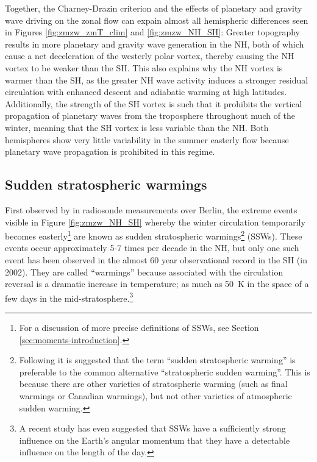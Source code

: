 \bigskip Together, the Charney-Drazin criterion and the effects of planetary and
gravity wave driving on the zonal flow can expain almost all hemispheric
differences seen in Figures \ref{fig:zmzw_zmT_clim} and \ref{fig:zmzw_NH_SH}:
Greater topography results in more planetary and gravity wave generation in the
NH, both of which cause a net deceleration of the westerly polar vortex, thereby
causing the NH vortex to be weaker than the SH. This also explains why the NH
vortex is warmer than the SH, as the greater NH wave activity induces a stronger
residual circulation with enhanced descent and adiabatic warming at high
latitudes. Additionally, the strength of the SH vortex is such that it prohibits
the vertical propagation of planetary waves from the troposphere throughout much
of the winter, meaning that the SH vortex is less variable than the NH. Both
hemispheres show very little variability in the summer easterly flow because
planetary wave propagation is prohibited in this regime.


\subsection{Sudden stratospheric warmings}
\label{sec:strat-sudd-warm}
First observed by \citet{Scherhag1952} in radiosonde measurements over Berlin,
the extreme events visible in Figure \ref{fig:zmzw_NH_SH} whereby the winter
circulation temporarily becomes easterly\footnote{For a discussion of more
  precise definitions of SSWs, see Section \ref{sec:moments-introduction}.} are
known as sudden stratospheric warmings\footnote{Following \citet{Butler2014a} it
  is suggested that the term ``sudden stratospheric warming'' is preferable to
  the common alternative ``stratospheric sudden warming''. This is because there
  are other varieties of stratospheric warming (such as final warmings or
  Canadian warmings), but not other varieties of atmospheric sudden warming.}
(SSWs). These events occur approximately 5-7 times per decade in the NH, but
only one such event has been observed in the almost 60 year observational record
in the SH (in 2002). They are called ``warmings'' because associated with the
circulation reversal is a dramatic increase in temperature; as much as 50~K in
the space of a few days in the mid-stratosphere.\footnote{A recent study
  \citep{Neef2014} has even suggested that SSWs have a sufficiently strong
  influence on the Earth's angular momentum that they have a detectable
  influence on the length of the day.}

